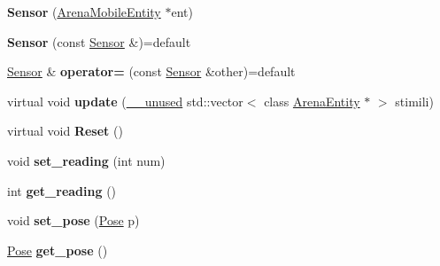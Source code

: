 \begin{DoxyCompactItemize}
\item 
{\bfseries Sensor} (\hyperlink{class_arena_mobile_entity}{Arena\+Mobile\+Entity} $\ast$ent)\hypertarget{class_sensor_a13c4b3a00db6e21e2ac33647440fdc37}{}\label{class_sensor_a13c4b3a00db6e21e2ac33647440fdc37}

\item 
{\bfseries Sensor} (const \hyperlink{class_sensor}{Sensor} \&)=default\hypertarget{class_sensor_ac1d81bc5c639eeafed38d69e40dc07b8}{}\label{class_sensor_ac1d81bc5c639eeafed38d69e40dc07b8}

\item 
\hyperlink{class_sensor}{Sensor} \& {\bfseries operator=} (const \hyperlink{class_sensor}{Sensor} \&other)=default\hypertarget{class_sensor_a48b21cd29fa3f183a2fb9e6447de2219}{}\label{class_sensor_a48b21cd29fa3f183a2fb9e6447de2219}

\item 
virtual void {\bfseries update} (\hyperlink{common_8h_a2e3484535ee610c8e19e9859563abe48}{\+\_\+\+\_\+unused} std\+::vector$<$ class \hyperlink{class_arena_entity}{Arena\+Entity} $\ast$ $>$ stimili)\hypertarget{class_sensor_a152c11dc8df6982d0fad5b2082055e78}{}\label{class_sensor_a152c11dc8df6982d0fad5b2082055e78}

\item 
virtual void {\bfseries Reset} ()\hypertarget{class_sensor_a5e6ad1aa7b2c48e59851e03404dacbde}{}\label{class_sensor_a5e6ad1aa7b2c48e59851e03404dacbde}

\item 
void {\bfseries set\+\_\+reading} (int num)\hypertarget{class_sensor_a3ee42616cfe5e55c1efa2a4fd6761a44}{}\label{class_sensor_a3ee42616cfe5e55c1efa2a4fd6761a44}

\item 
int {\bfseries get\+\_\+reading} ()\hypertarget{class_sensor_ae574c5b7e58bdbbc47c0d83a7561fa19}{}\label{class_sensor_ae574c5b7e58bdbbc47c0d83a7561fa19}

\item 
void {\bfseries set\+\_\+pose} (\hyperlink{struct_pose}{Pose} p)\hypertarget{class_sensor_a877b65abc60821f62fe16771923fba38}{}\label{class_sensor_a877b65abc60821f62fe16771923fba38}

\item 
\hyperlink{struct_pose}{Pose} {\bfseries get\+\_\+pose} ()\hypertarget{class_sensor_afa533b8d8bb5f3787682ffc5ab8c989c}{}\label{class_sensor_afa533b8d8bb5f3787682ffc5ab8c989c}


\end{DoxyCompactItemize}
